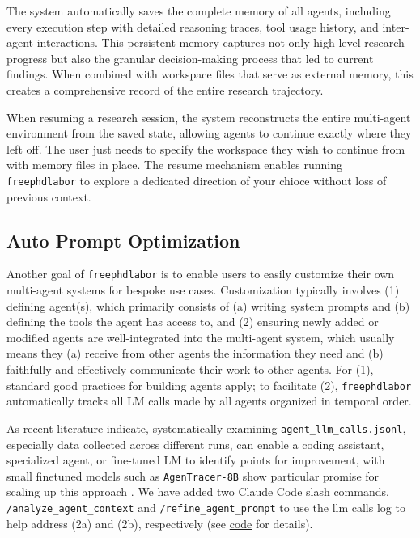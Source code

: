 \documentclass{article}
\begin{document}
The system automatically saves the complete memory of all agents, including every execution step with detailed reasoning traces, tool usage history, and inter-agent interactions. This persistent memory captures not only high-level research progress but also the granular decision-making process that led to current findings. When combined with workspace files that serve as external memory, this creates a comprehensive record of the entire research trajectory.

When resuming a research session, the system reconstructs the entire multi-agent environment from the saved state, allowing agents to continue exactly where they left off. The user just needs to specify the workspace they wish to continue from with memory files in place. The resume mechanism enables running \texttt{freephdlabor} to explore a dedicated direction of your chioce without loss of previous context.

\subsection*{Auto Prompt Optimization}
Another goal of \texttt{freephdlabor} is to enable users to easily customize their own multi-agent systems for bespoke use cases. Customization typically involves (1) defining agent(s), which primarily consists of (a) writing system prompts and (b) defining the tools the agent has access to, and (2) ensuring newly added or modified agents are well-integrated into the multi-agent system, which usually means they (a) receive from other agents the information they need and (b) faithfully and effectively communicate their work to other agents. For (1), standard good practices for building agents apply; to facilitate (2), \texttt{freephdlabor} automatically tracks all LM calls made by all agents organized in temporal order. 

As recent literature \cite{agrawal2025gepareflectivepromptevolution, zhang2025agentracerinducingfailurellm} indicate, systematically examining \texttt{agent\_llm\_calls.jsonl}, especially data collected across different runs, can enable a coding assistant, specialized agent, or fine-tuned LM to identify points for improvement, with small finetuned models such as \texttt{AgenTracer-8B} show particular promise for scaling up this approach \cite{zhang2025agentracerinducingfailurellm}. We have added two Claude Code slash commands, \texttt{/analyze\_agent\_context} and \texttt{/refine\_agent\_prompt} to use the llm calls log to help address (2a) and (2b), respectively (see \href{https://github.com/ltjed/freephdlabor}{code} for details).
\end{document}
